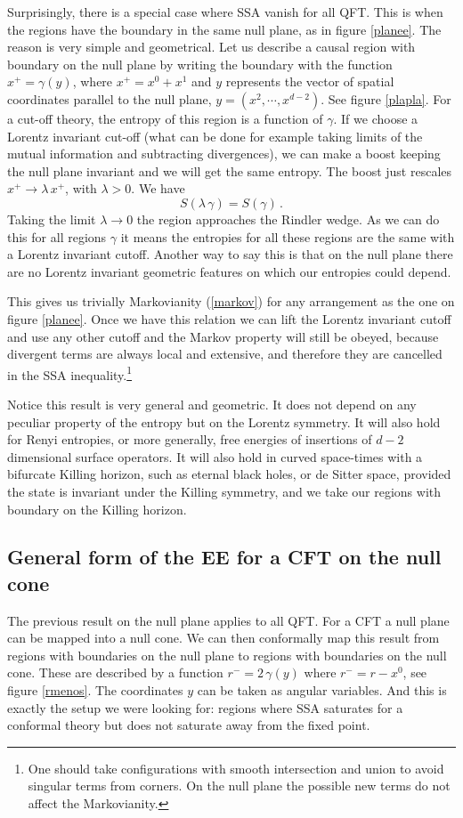 \documentclass[11pt]{article}
\numberwithin{equation}{section}
\newcommand{\be}{\begin{equation}}
\newcommand{\ee}{\end{equation}}
\begin{document}
Surprisingly, there is a special case where SSA vanish for all QFT. This is when the regions have the boundary in the same null plane, as in figure \ref{planee}.   
 The reason is very simple and geometrical. Let us describe a causal region with boundary on the null plane by writing the boundary with the function $x^+=\gamma(y)$, where $x^+=x^0+x^1$ and $y$ represents the vector of spatial coordinates parallel to the null plane, $y=(x^2,\cdots,x^{d-2})$. See figure \ref{plapla}. For a cut-off theory, the entropy of this region is a function of $\gamma$. If we choose a Lorentz invariant cut-off (what can be done for example taking limits of the mutual information and subtracting divergences), we can make a boost keeping the null plane invariant and we will get the same entropy. The boost just rescales $x^+\rightarrow \lambda\, x^+$, with $\lambda>0$. We have
 \be
 S(\lambda \,\gamma)=S(\gamma)\,.
\ee 
Taking the limit $\lambda\rightarrow 0$ the region approaches the Rindler wedge. As we can do this for all regions $\gamma$ it means the entropies for all these regions are the same with a Lorentz invariant cutoff. Another way to say this is that on the null plane there are no Lorentz invariant geometric features on which our entropies could depend. 

This gives us trivially Markovianity (\ref{markov}) for any arrangement as the one on figure \ref{planee}. Once we have this relation we can lift the Lorentz invariant cutoff and use any other cutoff and the Markov property will still be obeyed, because divergent terms are always local and extensive, and therefore they are cancelled in the SSA inequality.\footnote{One should take configurations with smooth intersection and union to avoid singular terms from corners. On the null plane the possible new terms do not affect the Markovianity.}  

Notice this result is very general and geometric. It does not depend on any peculiar property of the entropy but on the Lorentz symmetry. It will also hold for Renyi entropies, or more generally, free energies of insertions of $d-2$ dimensional surface operators. It will also hold in curved space-times with a bifurcate Killing horizon, such as eternal black holes, or de Sitter space, provided the state is invariant under the Killing symmetry, and we take our regions with boundary on the Killing horizon.   




\subsection{General form of the EE for a CFT on the null cone}
The previous result on the null plane applies to all QFT. For a CFT a null plane can be mapped into a null cone. We can then conformally map this result from regions with boundaries on the null plane to regions with boundaries on the null cone. These are described by a function $r^-=2 \,\gamma(y)$ where $r^-=r-x^0$, see figure \ref{rmenos}. The coordinates $y$ can be taken as angular variables. 
 And this is exactly the setup we were looking for: regions where SSA saturates for a conformal theory but does not saturate away from the fixed point. 
\end{document}
